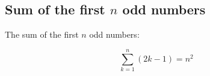 \subsection{Sum of the first $n$ odd numbers}

The sum of the first $n$ odd numbers:

\[
\sum_{k = 1}^{n} (2k - 1) = n^2
\]